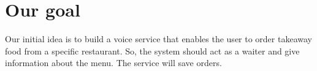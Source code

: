 \section{Our goal}

Our initial idea is to build a voice service that enables the user
to order takeaway food from a specific restaurant.
So, the system should act as a waiter and
give information about the menu.
The service will save orders.